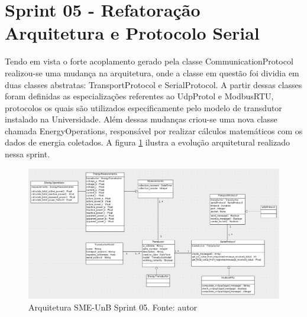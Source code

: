 \section{Sprint 05 - Refatoração Arquitetura e Protocolo Serial}
Tendo em vista o forte acoplamento gerado pela classe CommunicationProtocol realizou-se uma mudança na arquitetura, onde a classe em questão foi dividia em duas classes abstratas: TransportProtocol e SerialProtocol. A partir dessas classes foram definidas as especializações referentes ao UdpProtol e ModbusRTU, protocolos os quais são utilizados especificamente pelo modelo de transdutor instalado na Universidade. Além dessas mudanças criou-se uma nova classe chamada EnergyOperations, responsável por realizar cálculos matemáticos com os dados de energia coletados. A figura \ref{sprint05arq} ilustra a evolução arquitetural realizado nessa sprint.
\begin{figure}[!htpb]
    \centering
    \includegraphics[scale=0.5,angle=90]{figuras/sprint05arq.eps}
    \caption{Arquitetura SME-UnB Sprint 05. Fonte: autor}
    \label{sprint05arq}
\end{figure}

